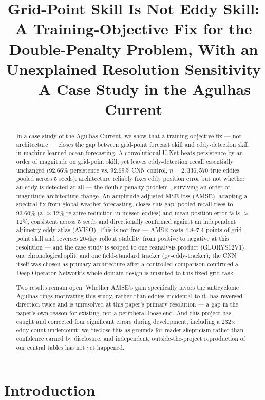 \documentclass[11pt]{article}
\title{Grid-Point Skill Is Not Eddy Skill: A Training-Objective Fix for the Double-Penalty Problem, With an Unexplained Resolution Sensitivity --- A Case Study in the Agulhas Current}
\author{}
\date{}
\begin{document}
\maketitle

\begin{abstract}
In a case study of the Agulhas Current, we show that a training-objective fix --- not architecture --- closes the gap between grid-point forecast skill and eddy-detection skill in machine-learned ocean forecasting. A convolutional U-Net beats persistence by an order of magnitude on grid-point skill, yet leaves eddy-detection recall essentially unchanged (92.66\% persistence vs. 92.69\% CNN control, $n=2{,}336{,}570$ true eddies pooled across 5 seeds): architecture reliably fixes eddy position error but not whether an eddy is detected at all --- the double-penalty problem \citep[]{Ebert2008,Gilleland2009}, surviving an order-of-magnitude architecture change. An amplitude-adjusted MSE loss (AMSE), adapting a spectral fix from global weather forecasting, closes this gap: pooled recall rises to 93.60\% (a $\approx$12\% relative reduction in missed eddies) and mean position error falls $\approx$12\%, consistent across 5 seeds and directionally confirmed against an independent altimetry eddy atlas (AVISO). This is not free --- AMSE costs 4.8--7.4 points of grid-point skill and reverses 20-day rollout stability from positive to negative at this resolution --- and the case study is scoped to one reanalysis product (GLORYS12V1), one chronological split, and one field-standard tracker (py-eddy-tracker); the CNN itself was chosen as primary architecture after a controlled comparison confirmed a Deep Operator Network's whole-domain design is unsuited to this fixed-grid task.

Two results remain open. Whether AMSE's gain specifically favors the anticyclonic Agulhas rings motivating this study, rather than eddies incidental to it, has reversed direction twice and is unresolved at this paper's primary resolution --- a gap in the paper's own reason for existing, not a peripheral loose end. And this project has caught and corrected four significant errors during development, including a 232$\times$ eddy-count undercount; we disclose this as grounds for reader skepticism rather than confidence earned by disclosure, and independent, outside-the-project reproduction of our central tables has not yet happened.
\end{abstract}

\section{Introduction}
\end{document}
